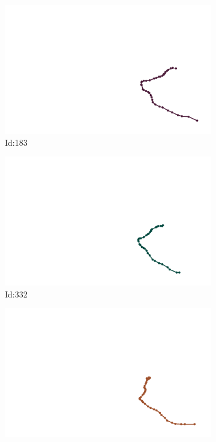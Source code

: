 \documentclass[12pt,twoside]{report}
\begin{document}
\begin{figure}
\centering
\begin{subfigure}[b]{0.20\textwidth}
\centering
\includegraphics[width=\textwidth]{../../trajectories/183.png}
\caption{Id:183}
\end{subfigure}
\begin{subfigure}[b]{0.20\textwidth}
\centering
\includegraphics[width=\textwidth]{../../trajectories/332.png}
\caption{Id:332}
\end{subfigure}
\begin{subfigure}[b]{0.20\textwidth}
\centering
\includegraphics[width=\textwidth]{../../trajectories/509.png}

\end{subfigure}
\end{figure}
\end{document}
